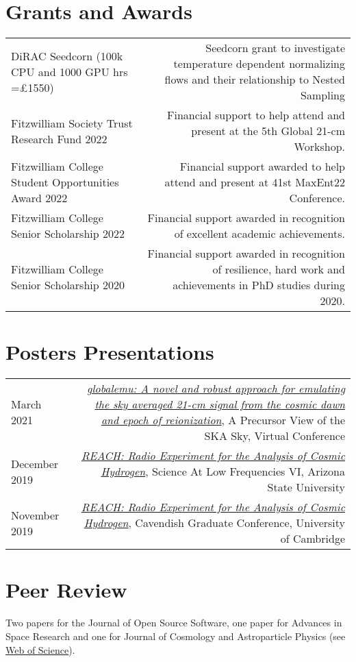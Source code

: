 \documentclass{article}
\begin{document}
\section*{Grants and Awards}

\begin{tabular}{l!{\vrule}r}
    DiRAC Seedcorn (100k CPU and 1000 GPU hrs =£1550) & Seedcorn grant to investigate temperature dependent normalizing flows and their relationship to Nested Sampling \\
    Fitzwilliam Society Trust Research Fund 2022 & Financial support to help attend and present at the 5th Global 21-cm Workshop. \\
	Fitzwilliam College Student Opportunities Award 2022 & Financial support awarded to help attend and present at 41st MaxEnt22 Conference. \\
	Fitzwilliam College Senior Scholarship 2022 & Financial support awarded in recognition of excellent academic achievements. \\
	Fitzwilliam College Senior Scholarship 2020 & Financial support awarded in recognition of resilience, hard work and achievements in PhD studies during 2020.
\end{tabular}

\section*{Posters Presentations}

\begin{tabular}{L!{\vrule}R}
	March 2021 & \href{https://github.com/htjb/Talks/blob/master/Posters/SKA_globalemu_March_2021/globalemu.pdf}{\textit{globalemu: A novel and robust approach for emulating the sky averaged 21-cm signal from the cosmic dawn and epoch of reionization}}, A Precursor View of the SKA Sky, Virtual Conference\\
	December 2019 & \href{https://drive.google.com/file/d/1dvgumyu4cXxXqoYxikU3DKOa4u_gpGzn/view}{\textit{REACH: Radio Experiment for the Analysis of Cosmic Hydrogen}}, Science At Low Frequencies VI, Arizona State University \\
	November 2019 & \href{https://github.com/htjb/Talks/blob/master/Posters/Cav_Graduate_Conf_REACH_Nov_2019/REACH_poster.pdf}{\textit{REACH: Radio Experiment for the Analysis of Cosmic Hydrogen}}, Cavendish Graduate Conference, University of Cambridge
\end{tabular}

\section*{Peer Review}
Two papers for the Journal of Open Source Software, one paper for Advances in Space Research and one for Journal of Cosmology and Astroparticle Physics (see \href{https://www.webofscience.com/wos/author/record/3920858}{Web of Science}).
\end{document}
